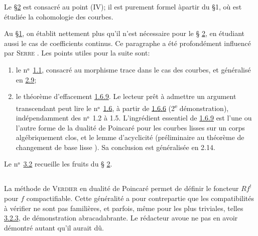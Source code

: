 Le \S \hyperref[XVIII.sec2]{2} est consacré au point (IV); il est purement formel
à\pageoriginale partir du \S 1, où est étudiée la cohomologie des
courbes.

Au \S \hyperref[XVIII.sec1]{1}, on établit nettement plus qu'il n'est nécessaire pour le \S
\hyperref[XVIII.sec2]{2}, en étudiant aussi le cas de coefficients continus. Ce paragraphe a
été profondément influencé par \textsc{Serre} \cite{6}.
Les points utiles pour la
suite sont:
\begin{enumerate}
\renewcommand{\theenumi}{\alph{enumi}}
\renewcommand{\labelenumi}{\theenumi)}
\item le nᵒ \hyperref[XVIII.subsec1.1]{1.1}, consacré au morphisme trace dans le
  cas des courbes, et généralisé en \hyperref[XVIII.thm2.9]{2.9};

\item le théorème d'effacement \hyperref[XVIII.lemfond1.6.9]{1.6.9}. Le lecteur prêt à admettre un
  argument transcendant peut lire le nᵒ \hyperref[XVIII.subsec1.6]{1.6}, à partir
  de \hyperref[XVIII.lem1.6.6]{1.6.6} (2\textsuperscript{e} démonstration), indépendamment des nᵒ 1.2
  à 1.5.
  L'ingrédient essentiel de \hyperref[XVIII.lemfond1.6.9]{1.6.9} est l'une ou l'autre
  forme de la dualité de Poincaré pour les courbes lisses sur un corps
  algébriquement clos, et le lemme d'acyclicité  (préliminaire
  au théorème de changement de base lisse ). Sa conclusion est
  généralisée en 2.14.
\end{enumerate}

Le nᵒ \hyperref[XVIII.subsec3.2]{3.2} recueille les fruits du \S
\hyperref[XVIII.sec2]{2}. 

\subsection{}
La méthode de \textsc{Verdier} en dualité de Poincaré permet de définir le
foncteur $Rf^{!}$ pour $f$ compactifiable. Cette généralité a pour
contrepartie que les compatibilités à vérifier ne sont pas familières,
et parfois, même pour les plus triviales, telles \hyperref[XVIII.lem3.2.3]{3.2.3}, de
démonstration abracadabrante. Le rédacteur avoue ne pas en avoir
démontré autant qu'il aurait dû.

